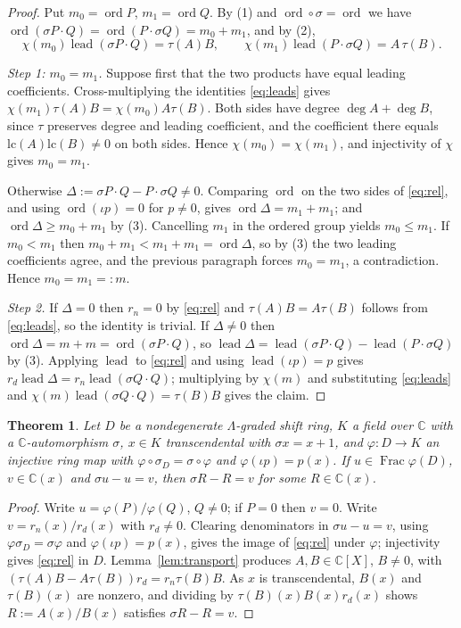 \documentclass[11pt,a4paper]{amsart}
\theoremstyle{plain}
\newtheorem{theorem}{Theorem}[section]
\theoremstyle{definition}
\newcommand{\CC}{\mathbb{C}}
\newcommand{\sig}{\sigma}
\newcommand{\ord}{\operatorname{ord}}
\newcommand{\lead}{\operatorname{lead}}
\newcommand{\Frac}{\operatorname{Frac}}
\begin{document}
\begin{proof}
Put $m_0=\ord P$, $m_1=\ord Q$. By (1) and $\ord\circ\sig=\ord$ we have
$\ord(\sig P\cdot Q)=\ord(P\cdot\sig Q)=m_0+m_1$, and by (2),
\begin{equation}\label{eq:leads}
  \chi(m_0)\lead(\sig P\cdot Q)=\tau(A)B,\qquad \chi(m_1)\lead(P\cdot\sig Q)=A\,\tau(B).
\end{equation}

\emph{Step 1: $m_0=m_1$.} Suppose first that the two products have equal leading coefficients.
Cross-multiplying the identities \eqref{eq:leads} gives
$\chi(m_1)\tau(A)B=\chi(m_0)A\tau(B)$. Both sides have degree $\deg A+\deg B$, since $\tau$ preserves
degree and leading coefficient, and the coefficient there equals
$\mathrm{lc}(A)\mathrm{lc}(B)\neq0$ on both sides. Hence $\chi(m_0)=\chi(m_1)$, and injectivity of
$\chi$ gives $m_0=m_1$.

Otherwise $\Delta:=\sig P\cdot Q-P\cdot\sig Q\neq0$. Comparing $\ord$ on the two sides of
\eqref{eq:rel}, and using $\ord(\iota p)=0$ for $p\neq0$, gives $\ord\Delta=m_1+m_1$; and
$\ord\Delta\ge m_0+m_1$ by (3). Cancelling $m_1$ in the ordered group yields $m_0\le m_1$. If
$m_0<m_1$ then $m_0+m_1<m_1+m_1=\ord\Delta$, so by (3) the two leading coefficients agree, and the
previous paragraph forces $m_0=m_1$, a contradiction. Hence $m_0=m_1=:m$.

\emph{Step 2.} If $\Delta=0$ then $r_n=0$ by \eqref{eq:rel} and $\tau(A)B=A\tau(B)$ follows from
\eqref{eq:leads}, so the identity is trivial. If $\Delta\neq0$ then $\ord\Delta=m+m=\ord(\sig P\cdot
Q)$, so $\lead\Delta=\lead(\sig P\cdot Q)-\lead(P\cdot\sig Q)$ by (3). Applying $\lead$ to
\eqref{eq:rel} and using $\lead(\iota p)=p$ gives $r_d\lead\Delta=r_n\lead(\sig Q\cdot Q)$;
multiplying by $\chi(m)$ and substituting \eqref{eq:leads} and
$\chi(m)\lead(\sig Q\cdot Q)=\tau(B)B$ gives the claim.
\end{proof}

\begin{theorem}\label{thm:inert}
Let $D$ be a nondegenerate $\Lambda$-graded shift ring, $K$ a field over $\CC$ with a
$\CC$-automorphism $\sig$, $x\in K$ transcendental with $\sig x=x+1$, and $\varphi\colon D\to K$ an
injective ring map with $\varphi\circ\sig_D=\sig\circ\varphi$ and $\varphi(\iota p)=p(x)$. If
$u\in\Frac\varphi(D)$, $v\in\CC(x)$ and $\sig u-u=v$, then $\sig R-R=v$ for some $R\in\CC(x)$.
\end{theorem}

\begin{proof}
Write $u=\varphi(P)/\varphi(Q)$, $Q\neq0$; if $P=0$ then $v=0$. Write $v=r_n(x)/r_d(x)$ with
$r_d\neq0$. Clearing denominators in $\sig u-u=v$, using $\varphi\sig_D=\sig\varphi$ and
$\varphi(\iota p)=p(x)$, gives the image of \eqref{eq:rel} under $\varphi$; injectivity gives
\eqref{eq:rel} in $D$. Lemma~\ref{lem:transport} produces $A,B\in\CC[X]$, $B\neq0$, with
$(\tau(A)B-A\tau(B))r_d=r_n\tau(B)B$. As $x$ is transcendental, $B(x)$ and $\tau(B)(x)$ are nonzero,
and dividing by $\tau(B)(x)B(x)r_d(x)$ shows $R:=A(x)/B(x)$ satisfies $\sig R-R=v$.
\end{proof}
\end{document}
